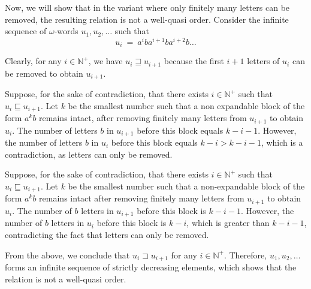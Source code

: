 \documentclass[12pt]{article}
\begin{document}
	\medskip
	
	Now, we will show that in the variant where only finitely many letters can
	be removed, the resulting relation is not a well-quasi order. Consider the
	infinite sequence of \(\omega\)-words \(u_{1}, u_{2}, \ldots\) such that
	\[ u_{i} \ = \ a^{i} b a^{i + 1} b a^{i + 2} b \ldots \]
	
	Clearly, for any \(i \in \mathbb{N}^{+}\), we have \(u_{i} \sqsupseteq
	u_{i + 1}\) because the first \(i + 1\) letters of \(u_{i}\) can be removed
	to obtain \(u_{i + 1}\).
	
	\medskip
	
	Suppose, for the sake of contradiction, that there exists \(i \in
	\mathbb{N}^{+}\) such that \(u_{i} \sqsubseteq u_{i + 1}\). Let \(k\) be the
	smallest number such that a non expandable block of the form \(a^{k} b\)
	remains intact, after removing finitely many letters from \(u_{i + 1}\) to
	obtain \(u_{i}\). The number of letters \(b\) in \(u_{i + 1}\) before this
	block equals \(k - i - 1\). However, the number of letters \(b\) in
	\(u_{i}\) before this block equals \(k - i > k - i - 1\), which is a
	contradiction, as letters can only be removed.
	
	Suppose, for the sake of contradiction, that there exists \(i \in
	\mathbb{N}^{+}\) such that \(u_{i} \sqsubseteq u_{i + 1}\). Let \(k\) be the
	smallest number such that a non-expandable block of the form \(a^{k} b\)
	remains intact after removing finitely many letters from \(u_{i + 1}\) to
	obtain \(u_{i}\). The number of \(b\) letters in \(u_{i + 1}\) before this
	block is \(k - i - 1\). However, the number of \(b\) letters in \(u_{i}\)
	before this block is \(k - i\), which is greater than \(k - i - 1\),
	contradicting the fact that letters can only be removed.
	
	\medskip
	
	From the above, we conclude that \(u_{i} \sqsupset u_{i + 1}\) for any \(i
	\in \mathbb{N}^{+}\). Therefore, \(u_{1}, u_{2}, \ldots\) forms an infinite
	sequence of strictly decreasing elements, which shows that the relation is
	not a well-quasi order.
\end{document}
